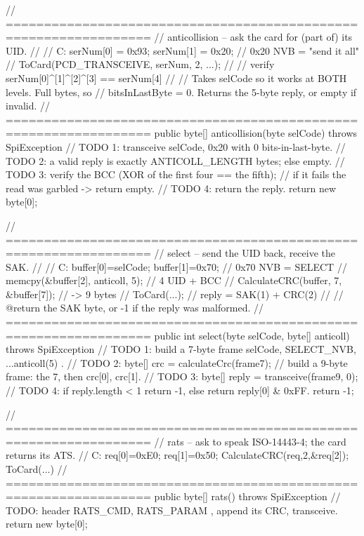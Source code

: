 \begin{jcode}
    // =================================================================
    // anticollision -- ask the card for (part of) its UID.
    //
    //   C: serNum[0] = 0x93; serNum[1] = 0x20;   // 0x20 NVB = "send it all"
    //      ToCard(PCD_TRANSCEIVE, serNum, 2, ...);
    //      // verify serNum[0]^[1]^[2]^[3] == serNum[4]
    //
    // Takes selCode so it works at BOTH levels. Full bytes, so
    // bitsInLastByte = 0. Returns the 5-byte reply, or empty if invalid.
    // =================================================================
    public byte[] anticollision(byte selCode) throws SpiException {
        // TODO 1: transceive { selCode, 0x20 } with 0 bits-in-last-byte.
        // TODO 2: a valid reply is exactly ANTICOLL_LENGTH bytes; else empty.
        // TODO 3: verify the BCC (XOR of the first four == the fifth);
        //         if it fails the read was garbled -> return empty.
        // TODO 4: return the reply.
        return new byte[0];
    }

    // =================================================================
    // select -- send the UID back, receive the SAK.
    //
    //   C: buffer[0]=selCode; buffer[1]=0x70;      // 0x70 NVB = SELECT
    //      memcpy(&buffer[2], anticoll, 5);        // 4 UID + BCC
    //      CalculateCRC(buffer, 7, &buffer[7]);    // -> 9 bytes
    //      ToCard(...);   // reply = SAK(1) + CRC(2)
    //
    // @return the SAK byte, or -1 if the reply was malformed.
    // =================================================================
    public int select(byte selCode, byte[] anticoll) throws SpiException {
        // TODO 1: build a 7-byte frame { selCode, SELECT_NVB, ...anticoll(5) }.
        // TODO 2: byte[] crc = calculateCrc(frame7);
        //         build a 9-byte frame: the 7, then crc[0], crc[1].
        // TODO 3: byte[] reply = transceive(frame9, 0);
        // TODO 4: if reply.length < 1 return -1, else return reply[0] & 0xFF.
        return -1;
    }

    // =================================================================
    // rats -- ask to speak ISO-14443-4; the card returns its ATS.
    //   C: req[0]=0xE0; req[1]=0x50; CalculateCRC(req,2,&req[2]); ToCard(...)
    // =================================================================
    public byte[] rats() throws SpiException {
        // TODO: header { RATS_CMD, RATS_PARAM }, append its CRC, transceive.
        return new byte[0];
    }


\end{jcode}
